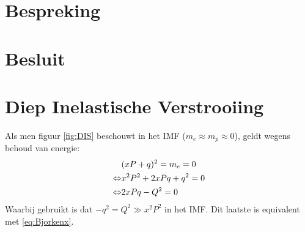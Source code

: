 \documentclass[a4paper,11pt]{article}
\numberwithin{equation}{section} %
\begin{document}
\section{Bespreking}

\section{Besluit}

\newpage
\appendix
\section{Diep Inelastische Verstrooiing} \label{app:DIS}
Als men figuur \ref{fig:DIS} beschouwt in het IMF ($m_e \approx m_p \approx 0$), geldt wegens behoud van energie:
\begin{align}
&(xP+q)^2 = m_e = 0 \notag \\
\Leftrightarrow &x^2 P^2 + 2xPq + q^2 = 0 \notag \\
\Leftrightarrow &2xPq -Q^2=0
\end{align}
Waarbij gebruikt is dat $-q^2 = Q^2 \gg x^2P^2$ in het  IMF. Dit laatste is equivalent met \eqref{eq:Bjorkenx}.
\end{document}
